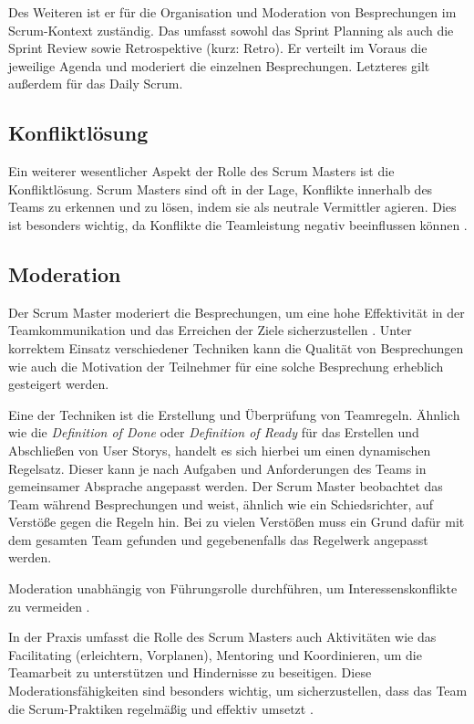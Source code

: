 \documentclass[5pt, final]{beamer}
\begin{document}
\begin{frame}[t]
\begin{multicols}{3}
			Des Weiteren ist er für die Organisation und Moderation von Besprechungen im Scrum-Kontext zuständig.
			Das umfasst sowohl das Sprint Planning als auch die Sprint Review sowie Retrospektive (kurz: Retro).
			Er verteilt im Voraus die jeweilige Agenda und moderiert die einzelnen Besprechungen.
			Letzteres gilt außerdem für das Daily Scrum.
			
			\subsection{Konfliktlösung}
			
			Ein weiterer wesentlicher Aspekt der Rolle des Scrum Masters ist die Konfliktlösung. Scrum Masters sind oft in der Lage, Konflikte innerhalb des Teams zu erkennen und zu lösen, indem sie als neutrale Vermittler agieren. Dies ist besonders wichtig, da Konflikte die Teamleistung negativ beeinflussen können \cite{Noll17}.
			
			\subsection{Moderation}
			
			Der Scrum Master moderiert die Besprechungen, um eine hohe Effektivität in der Teamkommunikation und das Erreichen der Ziele sicherzustellen \cite{vantighem24}.
			Unter korrektem Einsatz verschiedener Techniken kann die Qualität von Besprechungen wie auch die Motivation der Teilnehmer für eine solche Besprechung erheblich gesteigert werden.
			
			Eine der Techniken ist die Erstellung und Überprüfung von Teamregeln.
			Ähnlich wie die \textit{Definition of Done} oder \textit{Definition of Ready} für das Erstellen und Abschließen von User Storys, handelt es sich hierbei um einen dynamischen Regelsatz.
			Dieser kann je nach Aufgaben und Anforderungen des Teams in gemeinsamer Absprache angepasst werden.
			Der Scrum Master beobachtet das Team während Besprechungen und weist, ähnlich wie ein Schiedsrichter, auf Verstöße gegen die Regeln hin.
			Bei zu vielen Verstößen muss ein Grund dafür mit dem gesamten Team gefunden und gegebenenfalls das Regelwerk angepasst werden.
			
			Moderation unabhängig von Führungsrolle durchführen, um Interessenskonflikte zu vermeiden \cite[S. 23]{malten24}.
            
			In der Praxis umfasst die Rolle des Scrum Masters auch Aktivitäten wie das Facilitating (erleichtern, Vorplanen), Mentoring und Koordinieren, um die Teamarbeit zu unterstützen und Hindernisse zu beseitigen.
            Diese Moderationsfähigkeiten sind besonders wichtig, um sicherzustellen, dass das Team die Scrum-Praktiken regelmäßig und effektiv umsetzt \cite{Shastri21}.
			

\end{multicols}
\end{frame}
\end{document}
